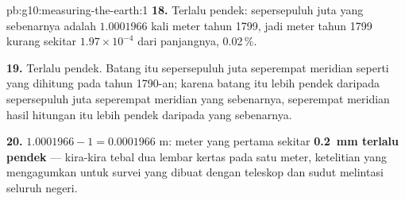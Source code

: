 \begin{solution}{pb:g10:measuring-the-earth:1}
\textbf{18.} Terlalu pendek: sepersepuluh juta yang sebenarnya adalah
$1.0001966$ kali meter tahun 1799, jadi meter tahun 1799 kurang sekitar
$1.97 \times 10^{-4}$ dari panjangnya, 0.02\,\%.

\textbf{19.} Terlalu pendek. Batang itu sepersepuluh juta seperempat meridian
seperti yang dihitung pada tahun 1790-an; karena batang itu lebih pendek
daripada sepersepuluh juta seperempat meridian yang sebenarnya, seperempat
meridian hasil hitungan itu lebih pendek daripada yang sebenarnya.

\textbf{20.} $1.0001966 - 1 = 0.0001966$ m: meter yang pertama sekitar
\textbf{\qty{0.2}{mm} terlalu pendek} --- kira-kira tebal dua lembar kertas
pada satu meter, ketelitian yang mengagumkan untuk survei yang dibuat dengan
teleskop dan sudut melintasi seluruh negeri.
\end{solution}
